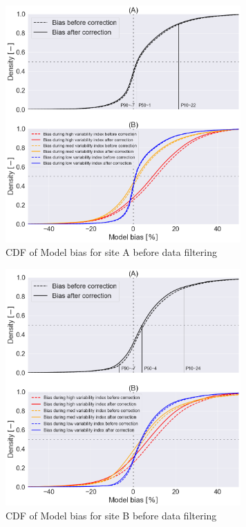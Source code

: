 \documentclass[conference]{IEEEtran}
\begin{document}
\begin{figure}[htbp]
\centerline{\includegraphics[width=9cm]{DCS_ModelBias_breakdown_CDF_v4.png}}
\caption{CDF of Model bias for site A before data filtering}
\label{fig:DCS-modelbias-cdf}
\end{figure}



\begin{figure}[htbp]
\centerline{\includegraphics[width=9cm]{PAW_ModelBias_breakdown_CDF_v4.png}}
\caption{CDF of Model bias for site B before data filtering}
\label{fig:PAW-modelbias-cdf}
\end{figure}
\end{document}
